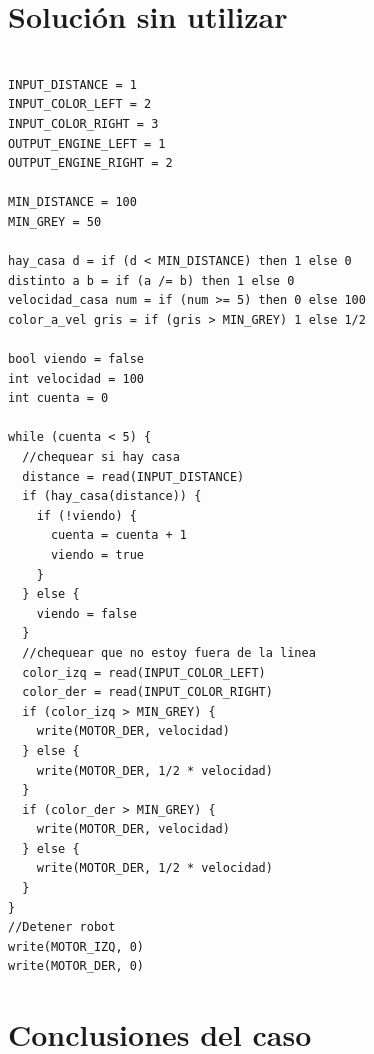 \section{Solución sin utilizar \frob}

\begin{verbatim}

INPUT_DISTANCE = 1
INPUT_COLOR_LEFT = 2
INPUT_COLOR_RIGHT = 3
OUTPUT_ENGINE_LEFT = 1
OUTPUT_ENGINE_RIGHT = 2

MIN_DISTANCE = 100
MIN_GREY = 50

hay_casa d = if (d < MIN_DISTANCE) then 1 else 0
distinto a b = if (a /= b) then 1 else 0
velocidad_casa num = if (num >= 5) then 0 else 100
color_a_vel gris = if (gris > MIN_GREY) 1 else 1/2

bool viendo = false
int velocidad = 100
int cuenta = 0

while (cuenta < 5) {
  //chequear si hay casa
  distance = read(INPUT_DISTANCE)
  if (hay_casa(distance)) {
    if (!viendo) {
      cuenta = cuenta + 1
      viendo = true
    }
  } else {
    viendo = false
  }
  //chequear que no estoy fuera de la linea
  color_izq = read(INPUT_COLOR_LEFT)
  color_der = read(INPUT_COLOR_RIGHT)
  if (color_izq > MIN_GREY) {
    write(MOTOR_DER, velocidad)
  } else {
    write(MOTOR_DER, 1/2 * velocidad)
  }
  if (color_der > MIN_GREY) {
    write(MOTOR_DER, velocidad)
  } else {
    write(MOTOR_DER, 1/2 * velocidad)
  }
}
//Detener robot
write(MOTOR_IZQ, 0)
write(MOTOR_DER, 0)

\end{verbatim}


\section {Conclusiones del caso}


